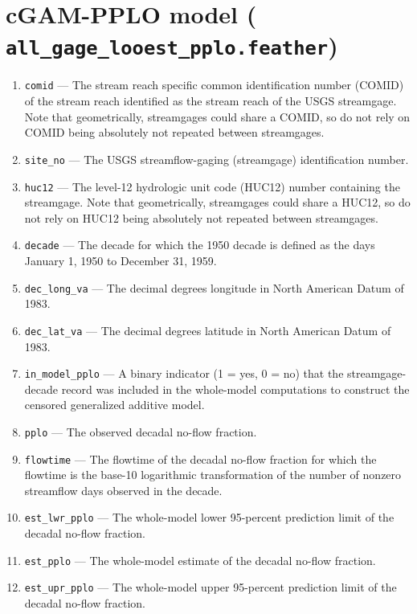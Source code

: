 \documentclass[1p, authoryear, 11pt, times, preprint]{elsarticle}
\newcommand{\code}[1]{{\color{black}%
                       \mbox{\lstinline[basicstyle={\small\ttfamily},
                                        keywordstyle=\scriptsize\ttfamily]|#1|}}}
\begin{document}
\singlespacing

\section{cGAM-PPLO model (\code{all_gage_looest_pplo.feather})}



\begin{enumerate}
\footnotesize
\RaggedRight
\item \code{comid} --- The stream reach specific common identification number (COMID) of the stream reach identified as the stream reach of the USGS streamgage. Note that geometrically, streamgages could share a COMID, so do not rely on COMID being absolutely not repeated between streamgages.
\item \code{site_no} --- The USGS streamflow-gaging (streamgage) identification number.
\item \code{huc12} --- The level-12 hydrologic unit code (HUC12) number containing the streamgage. Note that geometrically, streamgages could share a HUC12, so do not rely on HUC12 being absolutely not repeated between streamgages.
\item \code{decade} --- The decade for which the 1950 decade is defined as the days January 1, 1950 to December 31, 1959.
\item \code{dec_long_va} --- The decimal degrees longitude in North American Datum of 1983.
\item \code{dec_lat_va} --- The decimal degrees latitude in North American Datum of 1983.
\item \code{in_model_pplo} --- A binary indicator (1 = yes, 0 = no) that the streamgage-decade record was included in the whole-model computations to construct the censored generalized additive model.
\item \code{pplo} --- The observed decadal no-flow fraction.
\item \code{flowtime} --- The flowtime of the decadal no-flow fraction for which the flowtime is the base-10 logarithmic transformation of the number of nonzero streamflow days observed in the decade.
\item \code{est_lwr_pplo} --- The whole-model lower 95-percent prediction limit of the decadal no-flow fraction.
\item \code{est_pplo} --- The whole-model estimate of the decadal no-flow fraction.
\item \code{est_upr_pplo} --- The whole-model upper 95-percent prediction limit of the decadal no-flow fraction.

\end{enumerate}
\end{document}
